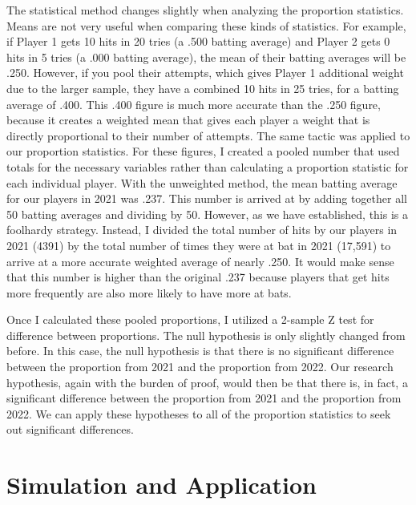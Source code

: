 \documentclass[10pt]{article}
\begin{document}
The statistical method changes slightly when analyzing the proportion statistics. Means are not very useful when comparing 
these kinds of statistics. For example, if Player 1 gets 10 hits in 20 tries (a .500 batting average) and Player 2 gets 0 hits 
in 5 tries (a .000 batting average), the mean of their batting averages will be .250. However, if you pool their attempts, 
which gives Player 1 additional weight due to the larger sample, they have a combined 10 hits in 25 tries, for a batting 
average of .400. This .400 figure is much more accurate than the .250 figure, because it creates a weighted mean that gives 
each player a weight that is directly proportional to their number of attempts. The same tactic was applied to our proportion 
statistics. For these figures, I created a pooled number that used totals for the necessary variables rather than calculating 
a proportion statistic for each individual player. With the unweighted method, the mean batting average for our players in 2021 
was .237. This number is arrived at by adding together all 50 batting averages and dividing by 50. However, as we have 
established, this is a foolhardy strategy. Instead, I divided the total number of hits by our players in 2021 (4391) by the 
total number of times they were at bat in 2021 (17,591) to arrive at a more accurate weighted average of nearly .250. It would 
make sense that this number is higher than the original .237 because players that get hits more frequently are also more likely 
to have more at bats. 

Once I calculated these pooled proportions, I utilized a 2-sample Z test for difference between proportions. The null 
hypothesis is only slightly changed from before. In this case, the null hypothesis is that there is no significant difference 
between the proportion from 2021 and the proportion from 2022. Our research hypothesis, again with the burden of proof, would 
then be that there is, in fact, a significant difference between the proportion from 2021 and the proportion from 2022. We can 
apply these hypotheses to all of the proportion statistics to seek out significant differences.

\section{Simulation and Application}
\end{document}
